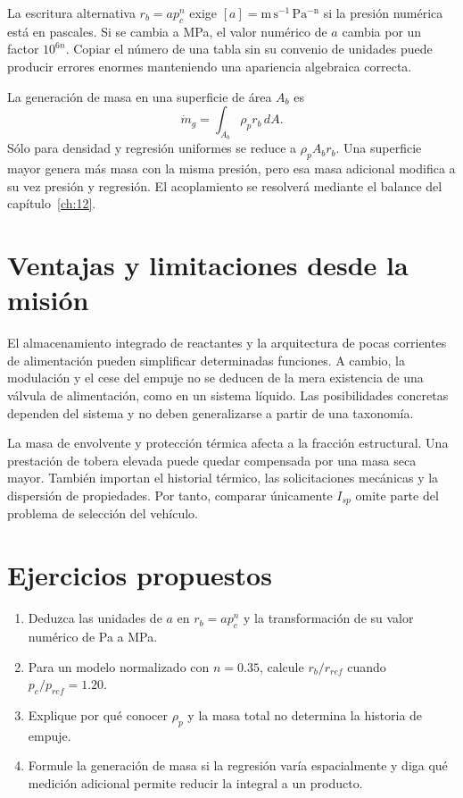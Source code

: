 La escritura alternativa $r_b=a p_c^n$ exige $[a]=\mathrm{m\,s^{-1}\,Pa^{-n}}$ si la presión numérica está en pascales. Si se cambia a MPa, el valor numérico de $a$ cambia por un factor $10^{6n}$. Copiar el número de una tabla sin su convenio de unidades puede producir errores enormes manteniendo una apariencia algebraica correcta.

La generación de masa en una superficie de área $A_b$ es
\begin{equation}\label{eq:massgeneration}
 \dot m_g=\int_{A_b}\rho_p r_b\,dA.
\end{equation}
Sólo para densidad y regresión uniformes se reduce a $\rho_pA_br_b$. Una superficie mayor genera más masa con la misma presión, pero esa masa adicional modifica a su vez presión y regresión. El acoplamiento se resolverá mediante el balance del capítulo~\ref{ch:12}.
\section{Ventajas y limitaciones desde la misión}
El almacenamiento integrado de reactantes y la arquitectura de pocas corrientes de alimentación pueden simplificar determinadas funciones. A cambio, la modulación y el cese del empuje no se deducen de la mera existencia de una válvula de alimentación, como en un sistema líquido. Las posibilidades concretas dependen del sistema y no deben generalizarse a partir de una taxonomía.

La masa de envolvente y protección térmica afecta a la fracción estructural. Una prestación de tobera elevada puede quedar compensada por una masa seca mayor. También importan el historial térmico, las solicitaciones mecánicas y la dispersión de propiedades. Por tanto, comparar únicamente $I_{sp}$ omite parte del problema de selección del vehículo.
\section{Ejercicios propuestos}
\begin{enumerate}
\item Deduzca las unidades de $a$ en $r_b=ap_c^n$ y la transformación de su valor numérico de Pa a MPa.
\item Para un modelo normalizado con $n=0.35$, calcule $r_b/r_{ref}$ cuando $p_c/p_{ref}=1.20$.
\item Explique por qué conocer $\rho_p$ y la masa total no determina la historia de empuje.
\item Formule la generación de masa si la regresión varía espacialmente y diga qué medición adicional permite reducir la integral a un producto.
\end{enumerate}
